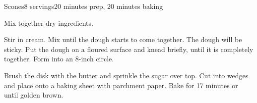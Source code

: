 \documentclass[../Cookbook.tex]{subfiles}
\begin{document}
\begin{recipe}{Scones}{8 servings}{20 minutes prep, 20 minutes baking}

Mix together dry ingredients.

Stir in cream. Mix until the dough starts to come together. The dough will be sticky. Put the dough on a floured surface and knead briefly, until it is completely together. Form into an 8-inch circle.

Brush the disk with the butter and sprinkle the sugar over top. Cut into wedges and place onto a baking sheet with parchment paper. Bake for 17 minutes or until golden brown.

\end{recipe}
\end{document}
